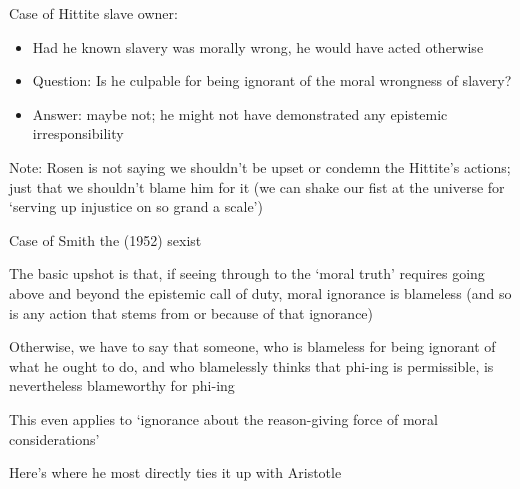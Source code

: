\documentclass[11pt]{article}
\begin{document}
\noindent Case of Hittite slave owner:

\begin{itemize}\item{Had he known slavery was morally wrong, he would have acted otherwise}\item{Question: Is he culpable for being ignorant of the moral wrongness of slavery?}\item{Answer: maybe not; he might not have demonstrated any epistemic irresponsibility}\end{itemize}

\noindent Note: Rosen is not saying we shouldn't be upset or condemn the Hittite's actions; just that we shouldn't blame him for it (we can shake our fist at the universe for `serving up injustice on so grand a scale')

\noindent Case of Smith the (1952) sexist
\vspace*{2mm}

\noindent The basic upshot is that, if seeing through to the `moral truth' requires going above and beyond the epistemic call of duty, moral ignorance is blameless (and so is any action that stems from or because of that ignorance)
\vspace*{2mm}

\noindent Otherwise, we have to say that someone, who is blameless for being ignorant of what he ought to do, and who blamelessly thinks that phi-ing is permissible, is nevertheless blameworthy for phi-ing
\vspace*{2mm}

\noindent This even applies to `ignorance about the reason-giving force of moral considerations'
\vspace*{2mm}

\noindent Here's where he most directly ties it up with Aristotle
\end{document}
